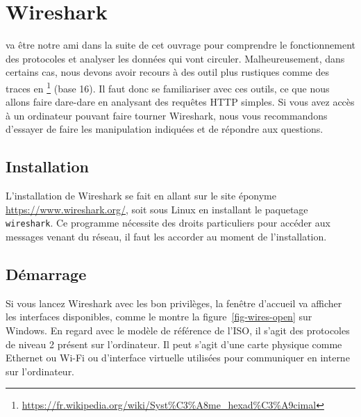 \chapter {Wireshark}

 va être notre ami dans la suite de cet ouvrage pour comprendre le fonctionnement des protocoles et analyser les données qui vont circuler. Malheureusement, dans certains cas, nous devons avoir recours à des outil plus rustiques comme des traces en \footnote{\url{https://fr.wikipedia.org/wiki/Syst\%C3\%A8me\_hexad\%C3\%A9cimal}} (base 16).  Il faut donc se familiariser avec ces outils, ce que nous allons faire dare-dare en analysant des requêtes HTTP simples. Si vous avez accès à un ordinateur pouvant faire tourner Wireshark, nous vous recommandons d'essayer de faire les manipulation indiquées et de répondre aux questions.

\section{Installation}

L'installation de Wireshark se fait en allant sur le site éponyme \url{https://www.wireshark.org/}, soit sous Linux en installant le paquetage \texttt{wireshark}. Ce programme nécessite des droits particuliers pour accéder aux messages venant du réseau, il faut les accorder au moment de l'installation.

\section{Démarrage}

Si vous lancez Wireshark avec les bon privilèges, la fenêtre d'accueil va afficher les interfaces disponibles, comme le montre la figure~\vref{fig-wires-open} sur Windows. En regard avec le modèle de référence de l'\ac{ISO}, il s'agit des protocoles de niveau 2 présent sur l'ordinateur. Il peut s'agit d'une carte physique comme Ethernet ou Wi-Fi ou d'interface virtuelle utilisées pour communiquer en interne sur l'ordinateur. 

